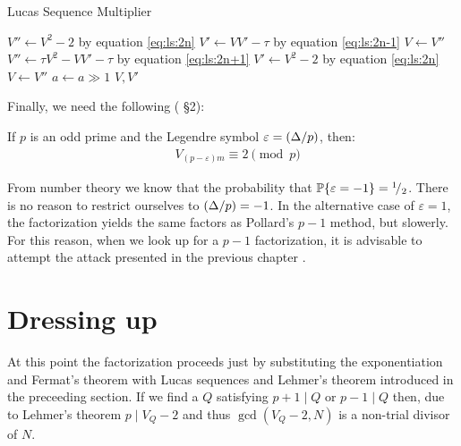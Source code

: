 \begin{algorithm}[H]
  \caption{Lucas Sequence Multiplier}
  \begin{algorithmic}[1]
          \State $V'' \gets V^2 -2$
          \Comment by equation \ref{eq:ls:2n}
          \State $V' \gets VV' - \tau$
          \Comment by equation \ref{eq:ls:2n-1}
          \State $V \gets V''$
          \State $V'' \gets \tau V^2 - VV' - \tau$
          \Comment by equation \ref{eq:ls:2n+1}
          \State $V' \gets V^2 -2$
          \Comment by equation \ref{eq:ls:2n}
          \State $V \gets V''$
        \EndIf
        \State $a \gets a \gg 1$
      \EndWhile
      \State \Return $V, V'$
    \EndFunction
  \end{algorithmic}
\end{algorithm}

Finally, we need the following (\cite{Williams:p+1} \S 2):
\begin{theorem*}[Lehmer]
  If $p$ is an odd prime and the Legendre symbol
  $\varepsilon = ({\Delta}/{p})$, then:
  \begin{align*}
  &  V_{(p - \varepsilon)m} \equiv 2 \pmod{p}
  \end{align*}
\end{theorem*}



\begin{remark}
  From number theory we know that the probability that
  $\mathbb{P}\{\varepsilon = -1\} = {}^{1}\!/_{2}$.
  There is no reason to restrict ourselves to
  $({\Delta}/{p}) = -1$.
  In the alternative case of $\varepsilon = 1$, the factorization yields the
  same factors as Pollard's $p-1$ method, but slowerly.
  For this reason, when we look up for a $p-1$ factorization, it is advisable
  to attempt the attack presented in the previous chapter \cite{Williams:p+1}.
\end{remark}


\section{Dressing up}

At this point the factorization proceeds just by substituting the
exponentiation and Fermat's theorem with Lucas sequences and Lehmer's theorem
introduced in the preceeding section. If we find a $Q$ satisfying $p+1 \mid Q
\text{ or } p-1 \mid Q$ then, due to Lehmer's theorem $p \mid V_Q -2$ and thus
$\gcd(V_Q -2, N)$ is a non-trial divisor of $N$.

